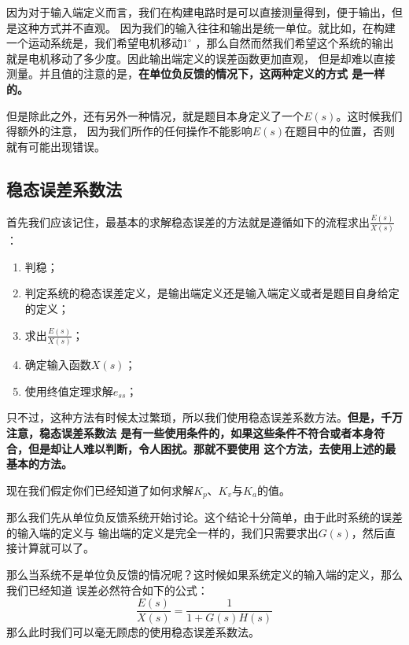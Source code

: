 \documentclass{ctexart}
\begin{document}
因为对于输入端定义而言，我们在构建电路时是可以直接测量得到，便于输出，但是这种方式并不直观。
因为我们的输入往往和输出是统一单位。就比如，在构建一个运动系统是，我们希望电机移动$1^\circ$
，那么自然而然我们希望这个系统的输出就是电机移动了多少度。因此输出端定义的误差函数更加直观，
但是却难以直接测量。并且值的注意的是，\textbf{在单位负反馈的情况下，这两种定义的方式
    是一样的。}

但是除此之外，还有另外一种情况，就是题目本身定义了一个$E(s)$。这时候我们得额外的注意，
因为我们所作的任何操作不能影响$E(s)$在题目中的位置，否则就有可能出现错误。

\subsection*{稳态误差系数法}
首先我们应该记住，最基本的求解稳态误差的方法就是遵循如下的流程求出$\frac{E(s)}{X(s)}$：
\begin{enumerate}
    \item 判稳；
    \item 判定系统的稳态误差定义，是输出端定义还是输入端定义或者是题目自身给定的定义；
    \item 求出$\frac{E(s)}{X(s)}$；
    \item 确定输入函数$X(s)$；
    \item 使用终值定理求解$e_{ss}$；
\end{enumerate}

只不过，这种方法有时候太过繁琐，所以我们使用稳态误差系数方法。\textbf{但是，千万注意，稳态误差系数法
    是有一些使用条件的，如果这些条件不符合或者本身符合，但是却让人难以判断，令人困扰。那就不要使用
    这个方法，去使用上述的最基本的方法。}

现在我们假定你们已经知道了如何求解$K_p$、$K_v$与$K_a$的值。

那么我们先从单位负反馈系统开始讨论。这个结论十分简单，由于此时系统的误差的输入端的定义与
输出端的定义是完全一样的，我们只需要求出$G(s)$，然后直接计算就可以了。

那么当系统不是单位负反馈的情况呢？这时候如果系统定义的输入端的定义，那么我们已经知道
误差必然符合如下的公式：
\begin{equation}
    \frac{E(s)}{X(s)} = \frac{1}{1 + G(s)H(s)}
\end{equation}
那么此时我们可以毫无顾虑的使用稳态误差系数法。
\end{document}
